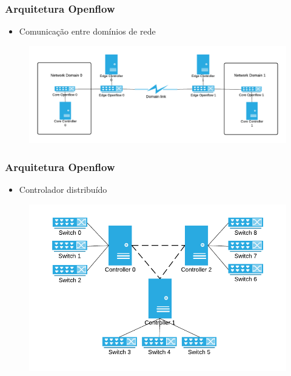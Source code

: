 %
%
\begin{frame}\frametitle{Arquitetura Openflow}

    \begin{itemize}
    \item Comunicação entre domínios de rede
    \end{itemize}
    
   
	\begin{figure}[h]\hspace*{-1cm}
        \centering
        \includegraphics[scale=0.3]{images/edge-core-sdn.png}
    \end{figure}
\end{frame}



%
%
\begin{frame}\frametitle{Arquitetura Openflow}

    \begin{itemize}
    \item Controlador distribuído
    \end{itemize}
    
	\begin{figure}[h]
        \centering
        \includegraphics[scale=0.4]{images/distributed_sdn_controller.png}
    \end{figure}
\end{frame}
